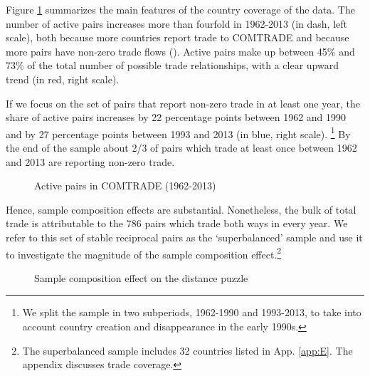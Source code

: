 \documentclass[12pt,twoside,a4paper,notitlepage]{article}
\begin{document}
Figure \ref{fig:active_pairs} summarizes the main features of the country coverage of the data.
The number of active pairs increases more than fourfold in 1962-2013 (in dash, left scale), both because more countries report trade to COMTRADE and because more pairs have non-zero trade flows (\cite{Helpman2008}).
Active pairs make up between 45\% and 73\% of the total number of possible trade relationships, with a clear upward trend (in red, right scale).

If we focus on the set of pairs that report non-zero trade in at least one year, the share of active pairs increases by 22 percentage points between 1962 and 1990 and by 27 percentage points between 1993 and 2013 (in blue, right scale).
\footnote{We split the sample in two subperiods, 1962-1990 and 1993-2013, to take into account country creation and disappearance in the early 1990s.}
By the end of the sample about 2/3 of pairs which trade at least once between 1962 and 2013 are reporting non-zero trade.

\begin{figure}[h!]
	\caption{Active pairs in COMTRADE (1962-2013) \label{fig:active_pairs}}
	\begin{center}
		\setlength{\fboxrule}{1pt} %
		\setlength{\fboxsep}{.1in} %
	\end{center}
\end{figure}

Hence, sample composition effects are substantial.
Nonetheless, the bulk of total trade is attributable to the 786 pairs which trade both ways in every year.
We refer to this set of stable reciprocal pairs as the `superbalanced' sample and use it to investigate the magnitude of the sample composition effect.\footnote{The superbalanced sample includes 32 countries listed in App. \ref{app:E}. The appendix discusses trade coverage.\label{fnsuperbalanced}}

\begin{figure}[H]
	\caption{Sample composition effect on the distance puzzle\label{fig:compsample}}
	\begin{center}
		\setlength{\fboxrule}{1pt} %
		\setlength{\fboxsep}{.1in} %
	\end{center}
\end{figure}
\end{document}
